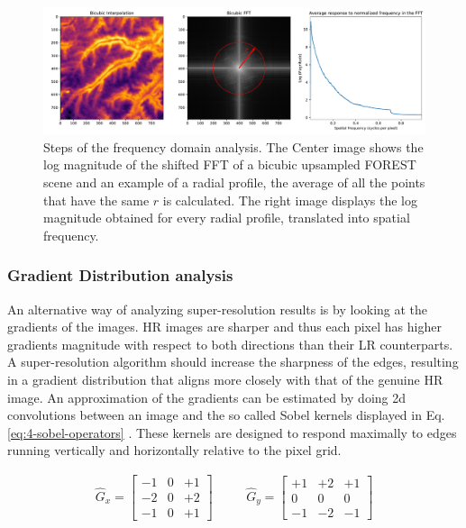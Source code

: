         \begin{figure}[ht!]
            \centering
            \includegraphics[width=\linewidth]{Includes/4-frequency-analysis.pdf}
            \caption{Steps of the frequency domain analysis. The Center image shows the log magnitude of the shifted FFT of a bicubic upsampled FOREST scene and an example of a radial profile, the average of all the points that have the same $r$ is calculated. The right image displays the log magnitude obtained for every radial profile, translated into spatial frequency.  }
            \label{fig:4-frequency-analysis}
        \end{figure}

        \subsubsection{Gradient Distribution analysis}


        An alternative way of analyzing super-resolution results is by looking at the gradients of the images. HR images are sharper and thus each pixel has higher gradients magnitude with respect to both directions than their LR counterparts. A super-resolution algorithm should increase the sharpness of the edges, resulting in a gradient distribution that aligns more closely with that of the genuine HR image. An approximation of the gradients can be estimated by doing 2d convolutions between an image and the so called Sobel kernels displayed in Eq. \ref{eq:4-sobel-operators} \cite{Sobel1990AnI3}. These kernels are designed to respond maximally to edges running vertically and horizontally relative to the pixel grid.
        
        \begin{equation}
            \begin{array}{ccc}
            \hat{G}_x = \begin{bmatrix}
            -1 & 0 & +1 \\
            -2 & 0 & +2 \\
            -1 & 0 & +1
            \end{bmatrix}
            &
            \quad
            &
            \hat{G}_y = \begin{bmatrix}
            +1 & +2 & +1 \\
             0 &  0 &  0 \\
            -1 & -2 & -1
            \end{bmatrix}
            \end{array}
            \label{eq:4-sobel-operators}
        \end{equation}
    
